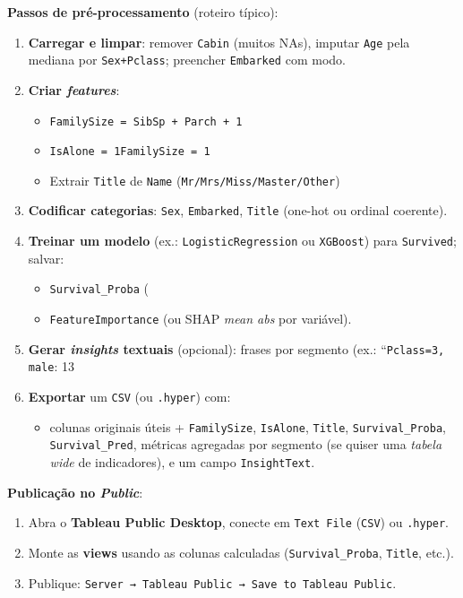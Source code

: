 \textbf{Passos de pré-processamento} (roteiro típico):
\begin{enumerate}[leftmargin=*]
\item \textbf{Carregar e limpar}: remover \texttt{Cabin} (muitos NAs), imputar \texttt{Age} pela mediana por \texttt{Sex+Pclass}; preencher \texttt{Embarked} com modo.
\item \textbf{Criar \emph{features}}:
\begin{itemize}
\item \texttt{FamilySize = SibSp + Parch + 1}
\item \texttt{IsAlone = 1{FamilySize = 1}}
\item Extrair \texttt{Title} de \texttt{Name} (\texttt{Mr/Mrs/Miss/Master/Other})
\end{itemize}
\item \textbf{Codificar categorias}: \texttt{Sex}, \texttt{Embarked}, \texttt{Title} (one-hot ou ordinal coerente).
\item \textbf{Treinar um modelo} (ex.: \texttt{LogisticRegression} ou \texttt{XGBoost}) para \texttt{Survived}; salvar:
\begin{itemize}
\item \texttt{Survival_Proba} (%
\item \texttt{FeatureImportance} (ou SHAP \emph{mean abs} por variável).
\end{itemize}
\item \textbf{Gerar \emph{insights} textuais} (opcional): frases por segmento (ex.: “\texttt{Pclass=3, male}: 13%
\item \textbf{Exportar} um \texttt{CSV} (ou \texttt{.hyper}) com:
\begin{itemize}
\item colunas originais úteis + \texttt{FamilySize}, \texttt{IsAlone}, \texttt{Title}, \texttt{Survival_Proba}, \texttt{Survival_Pred}, métricas agregadas por segmento (se quiser uma \emph{tabela wide} de indicadores), e um campo \texttt{InsightText}.
\end{itemize}
\end{enumerate}

\textbf{Publicação no \textit{Public}}:
\begin{enumerate}[leftmargin=*]
\item Abra o \textbf{Tableau Public Desktop}, conecte em \texttt{Text File} (\texttt{CSV}) ou \texttt{.hyper}.
\item Monte as \textbf{views} usando as colunas calculadas (\texttt{Survival_Proba}, \texttt{Title}, etc.).
\item Publique: \texttt{Server → Tableau Public → Save to Tableau Public}.
\end{enumerate}

